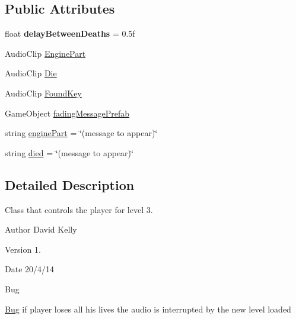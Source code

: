 \subsection*{Public Attributes}
\begin{DoxyCompactItemize}
\item 
\hypertarget{class_player_a690ec1561aafce0f3e480de83c707261}{float {\bfseries delay\-Between\-Deaths} = 0.\-5f}\label{class_player_a690ec1561aafce0f3e480de83c707261}

\item 
Audio\-Clip \hyperlink{class_player_afbe782b06cf141675680af069408cd6a}{Engine\-Part}
\item 
Audio\-Clip \hyperlink{class_player_a8e34fba594dbf68174d883d763d42ace}{Die}
\item 
Audio\-Clip \hyperlink{class_player_ae0ed5e4ea70a02e3f9c0ee8964c4fd64}{Found\-Key}
\item 
Game\-Object \hyperlink{class_player_a13d88e1c4562fddf90baf0d57afc68c5}{fading\-Message\-Prefab}
\item 
string \hyperlink{class_player_a66e422e9d0486bdb42c835142caa93c6}{engine\-Part} = \char`\"{}(message to appear)\char`\"{}
\item 
string \hyperlink{class_player_a998c3019f31ab3ad606453158abe9dcb}{died} = \char`\"{}(message to appear)\char`\"{}
\end{DoxyCompactItemize}


\subsection{Detailed Description}
Class that controls the player for level 3. 

\begin{DoxyAuthor}{Author}
David Kelly 
\end{DoxyAuthor}
\begin{DoxyVersion}{Version}
1. 
\end{DoxyVersion}
\begin{DoxyDate}{Date}
20/4/14
\end{DoxyDate}
\begin{DoxyRefDesc}{Bug}
\item[\hyperlink{bug__bug000004}{Bug}]if player loses all his lives the audio is interrupted by the new level loaded \end{DoxyRefDesc}


